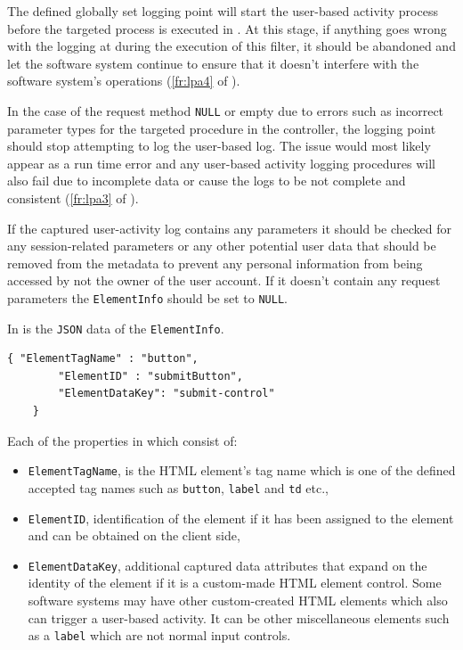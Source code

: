 The defined globally set logging point will start the user-based activity process before the targeted process is executed in . At this stage, if anything goes wrong with the logging at during the execution of this filter, it should be abandoned and let the software system continue to ensure that it doesn't interfere with the software system's operations (\ref{fr:lpa4} of ).\par In the case of the request method \texttt{NULL} or empty due to errors such as incorrect parameter types for the targeted procedure in the controller, the logging point should stop attempting to log the user-based log. The issue would most likely appear as a run time error and any user-based activity logging procedures will also fail due to incomplete data or cause the logs to be not complete and consistent (\ref{fr:lpa3} of ).\par If the captured user-activity log contains any parameters it should be checked for any session-related parameters or any other potential user data that should be removed from the metadata to prevent any personal information from being accessed by not the owner of the user account. If it doesn't contain any request parameters the \texttt{ElementInfo} should be set to \texttt{NULL}.\par In  is the \texttt{JSON} data of the \texttt{ElementInfo}. 

\begin{lstlisting}[style=json, caption={\textit{Element properties JSON}}, label={fig:Ch2_ElementInfo}] 
	{ "ElementTagName" : "button",
		"ElementID" : "submitButton",
		"ElementDataKey": "submit-control"		
	}
\end{lstlisting}

Each of the properties in  which consist of:

\begin{itemize}
	\item \texttt{ElementTagName}, is the HTML element's tag name which is one of the defined accepted tag names such as \texttt{button}, \texttt{label} and \texttt{td} etc.,
	\item \texttt{ElementID}, identification of the element if it has been assigned to the element and can be obtained on the client side,
	\item \texttt{ElementDataKey}, additional captured data attributes that expand on the identity of the element if it is a custom-made HTML element control. Some software systems may have other custom-created HTML elements which also can trigger a user-based activity. It can be other miscellaneous elements such as a \texttt{label} which are not normal input controls.
\end{itemize}



